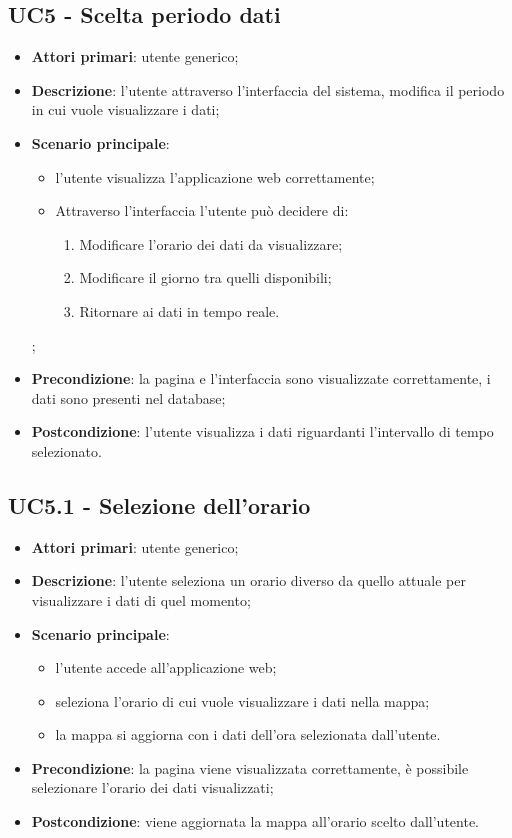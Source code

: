 \subsection{UC5 - Scelta periodo dati}
\begin{itemize}
\item \textbf{Attori primari}: utente generico;
\item \textbf{Descrizione}: l’utente attraverso l’interfaccia del sistema, modifica il periodo in cui vuole visualizzare i dati;
\item \textbf{Scenario principale}: 
	\begin{itemize}
		\item l’utente visualizza l’applicazione web correttamente;
		\item Attraverso l’interfaccia l’utente può decidere di:
			\begin{enumerate}
				\item Modificare l’orario dei dati da visualizzare;
				\item Modificare il giorno tra quelli disponibili;
				\item Ritornare ai dati in tempo reale.
			\end{enumerate}
	\end{itemize};
\item \textbf{Precondizione}: la pagina e l’interfaccia sono visualizzate correttamente, i dati sono presenti nel database;
\item \textbf{Postcondizione}: l’utente visualizza i dati riguardanti l’intervallo di tempo selezionato.
\end{itemize}

\subsection{UC5.1 - Selezione dell'orario}
\begin{itemize}
	\item \textbf{Attori primari}: utente generico;
	\item \textbf{Descrizione}: l’utente seleziona un orario diverso da quello attuale per visualizzare i dati di quel momento;
	\item \textbf{Scenario principale}:
		\begin{itemize}
			\item l’utente accede all’applicazione web;
			\item seleziona l’orario di cui vuole visualizzare i dati nella mappa;
			\item la mappa si aggiorna con i dati dell’ora selezionata dall’utente.
		\end{itemize}
	\item \textbf{Precondizione}: la pagina viene visualizzata correttamente, è possibile selezionare l’orario dei dati visualizzati;
	\item \textbf{Postcondizione}: viene aggiornata la mappa all’orario scelto dall’utente.
\end{itemize}

